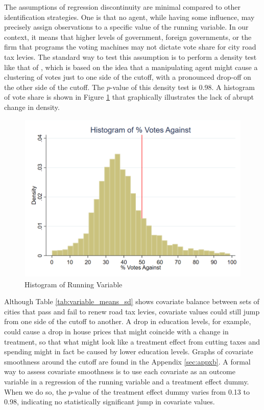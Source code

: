 The assumptions of regression discontinuity are minimal compared to other identification strategies.  One is that no agent, while having some influence, may precisely assign observations to a specific value of the running variable.  In our context, it means that higher levels of government, foreign governments, or the firm that programs the voting machines may not dictate vote share for city road tax levies.  The standard way to test this assumption is to perform a density test like that of \cite{cattaneo2020simple}, which is based on the idea that a manipulating agent might cause a clustering of votes just to one side of the cutoff, with a pronounced drop-off on the other side of the cutoff.  The $p$-value of this density test is 0.98. A histogram of vote share is shown in Figure \ref{fig:running_var_hist} that graphically illustrates the lack of abrupt change in density.  

\begin{figure}[ht]
    \centering
    \includegraphics[width=\textwidth,keepaspectratio]{images/votes_pct_against_histogram.png}
    \caption{Histogram of Running Variable}
    \label{fig:running_var_hist}
\end{figure}

Although Table \ref{tab:variable_means_sd} shows covariate balance between sets of cities that pass and fail to renew road tax levies, covariate values could still jump from one side of the cutoff to another. A drop in education levels, for example, could cause a drop in house prices that might coincide with a change in treatment, so that what might look like a treatment effect from cutting taxes and spending might in fact be caused by lower education levels.  Graphs of covariate smoothness around the cutoff are found in the Appendix \ref{sec:appxb}. A formal way to assess covariate smoothness is to use each covariate as an outcome variable in a regression of the running variable and a treatment effect dummy. When we do so, the $p$-value of the treatment effect dummy varies from 0.13 to 0.98, indicating no statistically significant jump in covariate values. 

